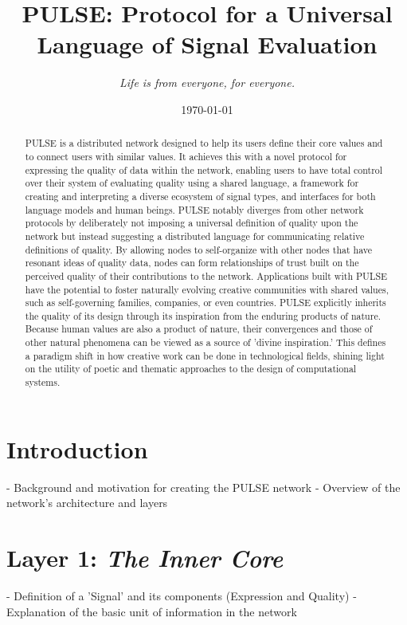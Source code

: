 \documentclass{article}
\title{PULSE: Protocol for a Universal Language of Signal Evaluation}
\author{\textit{Life is from everyone, for everyone.}}
\date{\today}
\begin{document}
\maketitle

\begin{abstract}
    PULSE is a distributed network designed to help its users define their core values and to connect users with similar values. It achieves this with a novel protocol for expressing the quality of data within the network, enabling users to have total control over their system of evaluating quality using a shared language, a framework for creating and interpreting a diverse ecosystem of signal types, and interfaces for both language models and human beings. PULSE notably diverges from other network protocols by deliberately not imposing a universal definition of quality upon the network but instead suggesting a distributed language for communicating relative definitions of quality. By allowing nodes to self-organize with other nodes that have resonant ideas of quality data, nodes can form relationships of trust built on the perceived quality of their contributions to the network. Applications built with PULSE have the potential to foster naturally evolving creative communities with shared values, such as self-governing families, companies, or even countries. PULSE explicitly inherits the quality of its design through its inspiration from the enduring products of nature. Because human values are also a product of nature, their convergences and those of other natural phenomena can be viewed as a source of 'divine inspiration.' This defines a paradigm shift in how creative work can be done in technological fields, shining light on the utility of poetic and thematic approaches to the design of computational systems.
\end{abstract}

\section{Introduction}
- Background and motivation for creating the PULSE network
- Overview of the network's architecture and layers

\section{Layer 1: \textit{The Inner Core}}
- Definition of a 'Signal' and its components (Expression and Quality)
- Explanation of the basic unit of information in the network
\end{document}
